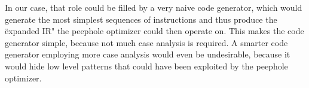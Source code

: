 In our case, that role could be filled by a very naive code generator, which
would generate the most simplest sequences of instructions and thus produce the
\"expanded IR" the peephole optimizer could then operate on. This makes the code
generator simple, because not much case analysis is required. A smarter code
generator employing more case analysis would even be undesirable, because it
would hide low level patterns that could have been exploited by the peephole
optimizer.




%
%


%
%

%
%
%

